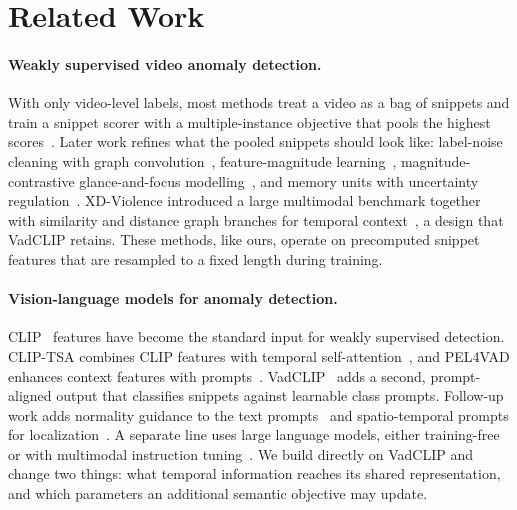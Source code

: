 
\section{Related Work}
\label{sec:related}

\paragraph{Weakly supervised video anomaly detection.}
With only video-level labels, most methods treat a video as a bag of snippets and train a snippet scorer with a multiple-instance objective that pools the highest scores~\cite{sultani2018real}. Later work refines what the pooled snippets should look like: label-noise cleaning with graph convolution~\cite{zhong2019gcnlnc}, feature-magnitude learning~\cite{tian2021rtfm}, magnitude-contrastive glance-and-focus modelling~\cite{chen2022mgfn}, and memory units with uncertainty regulation~\cite{zhou2023urdmu}. XD-Violence introduced a large multimodal benchmark together with similarity and distance graph branches for temporal context~\cite{wu2020xdviolence}, a design that VadCLIP retains. These methods, like ours, operate on precomputed snippet features that are resampled to a fixed length during training.

\paragraph{Vision-language models for anomaly detection.}
CLIP~\cite{radford2021clip} features have become the standard input for weakly supervised detection. CLIP-TSA combines CLIP features with temporal self-attention~\cite{joo2023cliptsa}, and PEL4VAD enhances context features with prompts~\cite{pu2023pel4vad}. VadCLIP~\cite{wu2024vadclip} adds a second, prompt-aligned output that classifies snippets against learnable class prompts. Follow-up work adds normality guidance to the text prompts~\cite{yang2024tpwng} and spatio-temporal prompts for localization~\cite{wu2024stprompt}. A separate line uses large language models, either training-free~\cite{zanella2024lavad} or with multimodal instruction tuning~\cite{zhang2024holmesvad}. We build directly on VadCLIP and change two things: what temporal information reaches its shared representation, and which parameters an additional semantic objective may update.

